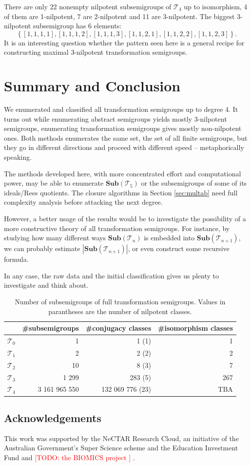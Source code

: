\documentclass{amsart}
\newcommand{\cT}{{\mathcal T}}
\newcommand{\Sub}{\mathbf{Sub}}
\newcommand{\todo}[1]{\textcolor{red}{ \small \textsf{[TODO:  #1 ]} \normalsize}}
\theoremstyle{plain}
\theoremstyle{definition}
\begin{document}
There are only 22 nonempty nilpotent subsemigroups of $\cT_4$ up to isomorphism, 4 of them are 1-nilpotent, 7 are 2-nilpotent and 11 are 3-nilpotent.
The biggest 3-nilpotent subsemigroup has 6 elements:
$$\left\{[1,1,1,1],[1,1,1,2],[1,1,1,3],[1,1,2,1],[1,1,2,2],[1,1,2,3]\right\}.$$
It is an interesting question whether the pattern seen here is a general recipe for constructing maximal 3-nilpotent transformation semigroups.
\section{Summary and Conclusion}
We enumerated and classified all transformation semigroups up to degree 4.
It turns out while enumerating abstract semigroups yields mostly 3-nilpotent semigroups, enumerating transformation semigroups gives mostly non-nilpotent ones.
Both methods enumerates the same set, the set of all finite semigroups, but they go in different directions and proceed with different speed -- metaphorically speaking. 

The methods developed here, with more concentrated effort and computational power,  may be able to enumerate $\Sub(\cT_5)$ or the subsemigroups of some of its ideals/Rees quotients. 
The closure algorithms in Section \ref{sec:multab} need full complexity analysis before attacking the next degree. 

However, a better usage of the results would be to investigate the possibility of a more constructive theory of all transformation semigroups.
For instance, by studying how many different ways $\Sub(\cT_n)$ is embedded into $\Sub(\cT_{n+1})$, we can probably estimate $|\Sub(\cT_{n+1})|$, or even construct some recursive formula.

In any case, the raw data and the initial classification gives us plenty to investigate and think about.
\begin{table}
\renewcommand{\arraystretch}{1}
\begin{tabular}{|c|r|r|r|}
\hline
 & \#subsemigroups & \#conjugacy classes & \#isomorphism classes \\
\hline
$\cT_0$ & 1  & 1 (1)& 1\\
\hline
$\cT_1$ & 2  & 2 (2)& 2\\
\hline
$\cT_2$ & 10  & 8 (3)& 7\\
\hline
$\cT_3$ & 1 299 & 283 (5)& 267\\
\hline
$\cT_4$ & 3 161 965 550 & 132 069 776 (23)& TBA\\
\hline
\end{tabular}
\caption{Number of subsemigroups of full transformation semigroups. Values in parantheses are the number of nilpotent classes.}
\end{table}

\subsection*{Acknowledgements}
This work was supported by the NeCTAR Research Cloud, an
initiative of the Australian Government's Super Science scheme and the
Education Investment Fund and \todo{the BIOMICS project}.



\end{document}
